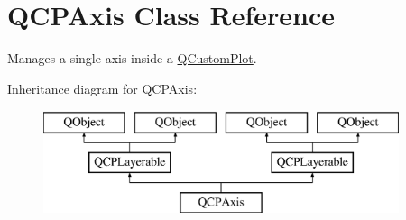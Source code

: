 \hypertarget{class_q_c_p_axis}{}\section{Q\+C\+P\+Axis Class Reference}
\label{class_q_c_p_axis}


Manages a single axis inside a \hyperlink{class_q_custom_plot}{Q\+Custom\+Plot}.  


Inheritance diagram for Q\+C\+P\+Axis\+:\begin{figure}[H]
\begin{center}
\leavevmode
\includegraphics[height=3.000000cm]{class_q_c_p_axis}
\end{center}
\end{figure}

